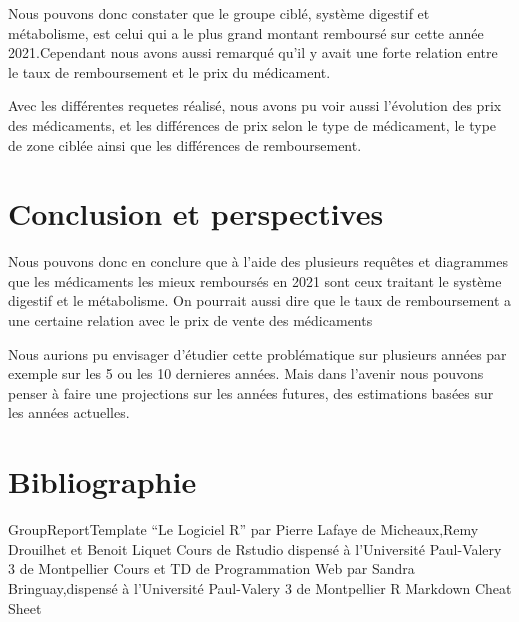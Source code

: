 \documentclass[mstat,12pt]{unswthesis}
\begin{document}
Nous pouvons donc constater que le groupe ciblé, système digestif et
métabolisme, est celui qui a le plus grand montant remboursé sur cette
année 2021.Cependant nous avons aussi remarqué qu'il y avait une forte
relation entre le taux de remboursement et le prix du médicament.
\bigskip \bigskip

\bigskip
\centering

Avec les différentes requetes réalisé, nous avons pu voir aussi
l'évolution des prix des médicaments, et les différences de prix selon
le type de médicament, le type de zone ciblée ainsi que les différences
de remboursement.

\hypertarget{conclusion-et-perspectives}{%
\chapter{Conclusion et perspectives}\label{conclusion-et-perspectives}}

Nous pouvons donc en conclure que à l'aide des plusieurs requêtes et
diagrammes que les médicaments les mieux remboursés en 2021 sont ceux
traitant le système digestif et le métabolisme. On pourrait aussi dire
que le taux de remboursement a une certaine relation avec le prix de
vente des médicaments

\bigskip
\bigskip
\bigskip
\centering

Nous aurions pu envisager d'étudier cette problématique sur plusieurs
années par exemple sur les 5 ou les 10 dernieres années. Mais dans
l'avenir nous pouvons penser à faire une projections sur les années
futures, des estimations basées sur les années actuelles.

\hypertarget{bibliographie}{%
\chapter*{Bibliographie}\label{bibliographie}}

\hypertarget{refs}{}
\begin{CSLReferences}{0}{0}
\end{CSLReferences}

\bigskip
\bigskip
\centering

GroupReportTemplate \bigskip \bigskip \centering ``Le Logiciel R'' par
Pierre Lafaye de Micheaux,Remy Drouilhet et Benoit Liquet \bigskip
\centering Cours de Rstudio dispensé à l'Université Paul-Valery 3 de
Montpellier \bigskip \centering Cours et TD de Programmation Web par
Sandra Bringuay,dispensé à l'Université Paul-Valery 3 de Montpellier
\bigskip \centering R Markdown Cheat Sheet
\end{document}

